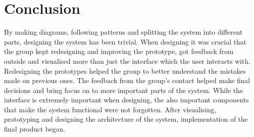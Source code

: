\chapter{Conclusion}

By making diagrams, following patterns and splitting the system into different parts, designing the system has been trivial.
When designing it was crucial that the group kept redesigning and improving the prototype, got feedback from outside and visualised more than just the interface which the user interacts with.
Redesigning the prototypes helped the group to better understand the mistakes made on previous ones.
The feedback from the group's contact helped make final decisions and bring focus on to more important parts of the system.
While the interface is extremely important when designing, the also important components that make the system functional were not forgotten.
After visualising, prototyping and designing the architecture of the system, implementation of the final product began.